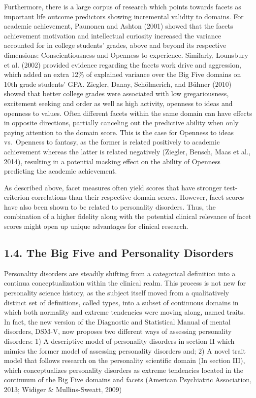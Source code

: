 \documentclass[,man]{apa6}
\theoremstyle{definition}
\theoremstyle{definition}
\theoremstyle{definition}
\theoremstyle{remark}
\begin{document}
Furthermore, there is a large corpus of research which points towards
facets as important life outcome predictors showing incremental validity
to domains. For academic achievement, Paunonen and Ashton (2001) showed
that the facets achievement motivation and intellectual curiosity
increased the variance accounted for in college students' grades, above
and beyond its respective dimensions: Conscientiousness and Openness to
experience. Similarly, Lounsbury et al. (2002) provided evidence
regarding the facets work drive and aggression, which added an extra
12\% of explained variance over the Big Five domains on 10th grade
students' GPA. Ziegler, Danay, Schölmerich, and Bühner (2010) showed
that better college grades were associated with low gregariousness,
excitement seeking and order as well as high activity, openness to ideas
and openness to values. Often different facets within the same domain
can have effects in opposite directions, partially canceling out the
predictive ability when only paying attention to the domain score. This
is the case for Openness to ideas vs.~Openness to fantasy, as the former
is related positively to academic achievement whereas the latter is
related negatively (Ziegler, Bensch, Maas et al., 2014), resulting in a
potential masking effect on the ability of Openness predicting the
academic achievement.

As described above, facet measures often yield scores that have stronger
test-criterion correlations than their respective domain scores.
However, facet scores have also been shown to be related to personality
disorders. Thus, the combination of a higher fidelity along with the
potential clinical relevance of facet scores might open up unique
advantages for clinical research.

\hypertarget{the-big-five-and-personality-disorders}{%
\subsection{1.4. The Big Five and Personality
Disorders}\label{the-big-five-and-personality-disorders}}

Personality disorders are steadily shifting from a categorical
definition into a continua conceptualization within the clinical realm.
This process is not new for personality science history, as the subject
itself moved from a qualitatively distinct set of definitions, called
types, into a subset of continuous domains in which both normality and
extreme tendencies were moving along, named traits. In fact, the new
version of the Diagnostic and Statistical Manual of mental disorders,
DSM-V, now proposes two different ways of assessing personality
disorders: 1) A descriptive model of personality disorders in section II
which mimics the former model of assessing personality disorders and; 2)
A novel trait model that follows research on the personality scientific
domain (In section III), which conceptualizes personality disorders as
extreme tendencies located in the continuum of the Big Five domains and
facets (American Psychiatric Association, 2013; Widiger \&
Mullins-Sweatt, 2009)
\end{document}
